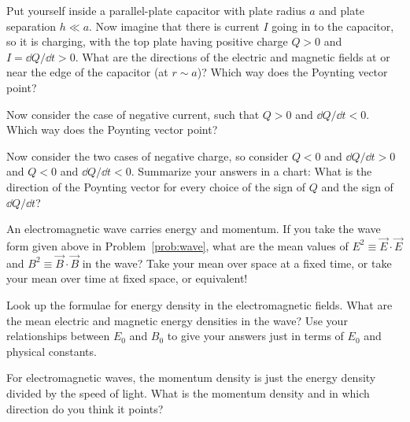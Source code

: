 \documentclass[12pt]{article}
\begin{document}
\startproblem%
Put yourself inside a parallel-plate capacitor with plate radius $a$
and plate separation $h\ll a$. Now imagine that there is current $I$
going in to the capacitor, so it is charging, with the top plate having
positive charge $Q>0$ and $I = \dd Q/\dd t > 0$. What are the directions
of the electric and magnetic fields at or near the edge of the capacitor
(at $r\sim a$)? Which way does the Poynting vector point?

Now consider the case of negative current, such that $Q>0$ and $\dd
Q/\dd t<0$. Which way does the Poynting vector point?

Now consider the two cases of negative charge, so consider $Q<0$ and
$\dd Q/\dd t>0$ and $Q<0$ and $\dd Q/\dd t<0$. Summarize your answers
in a chart: What is the direction of the Poynting vector for every
choice of the sign of $Q$ and the sign of $\dd Q/\dd t$?

\startproblem%
An electromagnetic wave carries energy and momentum. If you take the
wave form given above in Problem~\ref{prob:wave}, what are the mean
values of $E^2\equiv\vec{E}\cdot\vec{E}$ and
$B^2\equiv\vec{B}\cdot\vec{B}$ in the wave? Take your mean over space at
a fixed time, or take your mean over time at fixed space, or equivalent!

Look up the formulae for energy density
in the electromagnetic fields. What are the mean electric and magnetic energy densities
in the wave? Use your relationships between $E_0$ and $B_0$ to give
your answers just in terms of $E_0$ and physical constants.

For electromagnetic waves, the momentum density is just the energy density
divided by the speed of light. What is the momentum density and in which
direction do you think it points?
\end{document}
